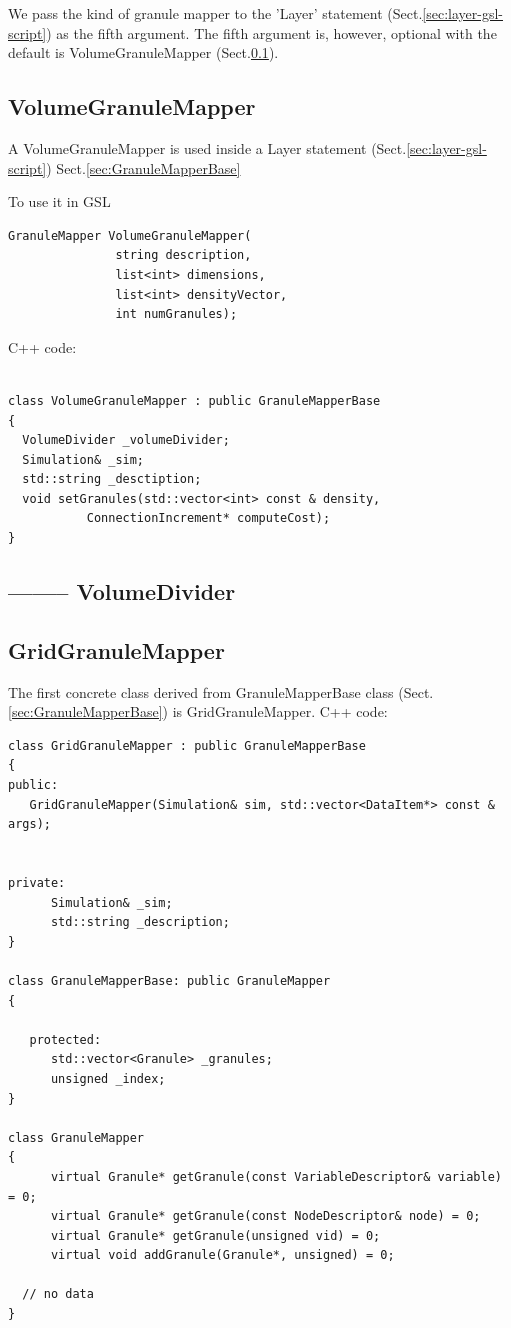 We pass the kind of granule mapper to the 'Layer' statement
(Sect.\ref{sec:layer-gsl-script}) as the fifth argument. The fifth
argument is, however, optional with the default is VolumeGranuleMapper
(Sect.\ref{sec:VolumeGranuleMapper}).

\subsection{VolumeGranuleMapper}
\label{sec:VolumeGranuleMapper}

A VolumeGranuleMapper is used inside a Layer statement (Sect.\ref{sec:layer-gsl-script})
Sect.\ref{sec:GranuleMapperBase}

To use it in GSL
\begin{verbatim}
GranuleMapper VolumeGranuleMapper(
               string description,
               list<int> dimensions,
               list<int> densityVector,
               int numGranules); 
\end{verbatim}


C++ code:
{\tiny
\begin{lstlisting}

class VolumeGranuleMapper : public GranuleMapperBase
{
  VolumeDivider _volumeDivider;
  Simulation& _sim;
  std::string _desctiption;
  void setGranules(std::vector<int> const & density,
           ConnectionIncrement* computeCost);
}

\end{lstlisting}
}

\subsection{-------- VolumeDivider}
\label{sec:VolumeDivider}



\subsection{GridGranuleMapper}
\label{sec:GridGranuleMapper}

The first concrete class derived from GranuleMapperBase class
(Sect.\ref{sec:GranuleMapperBase}) is GridGranuleMapper.  C++ code:

{\tiny
\begin{lstlisting}
class GridGranuleMapper : public GranuleMapperBase
{
public:
   GridGranuleMapper(Simulation& sim, std::vector<DataItem*> const & args);
      

private:
      Simulation& _sim;
      std::string _description;
}

class GranuleMapperBase: public GranuleMapper
{

   protected:
      std::vector<Granule> _granules;
      unsigned _index;
}

class GranuleMapper
{
      virtual Granule* getGranule(const VariableDescriptor& variable) = 0;
      virtual Granule* getGranule(const NodeDescriptor& node) = 0;
      virtual Granule* getGranule(unsigned vid) = 0;
      virtual void addGranule(Granule*, unsigned) = 0;

  // no data
}
\end{lstlisting}
}


